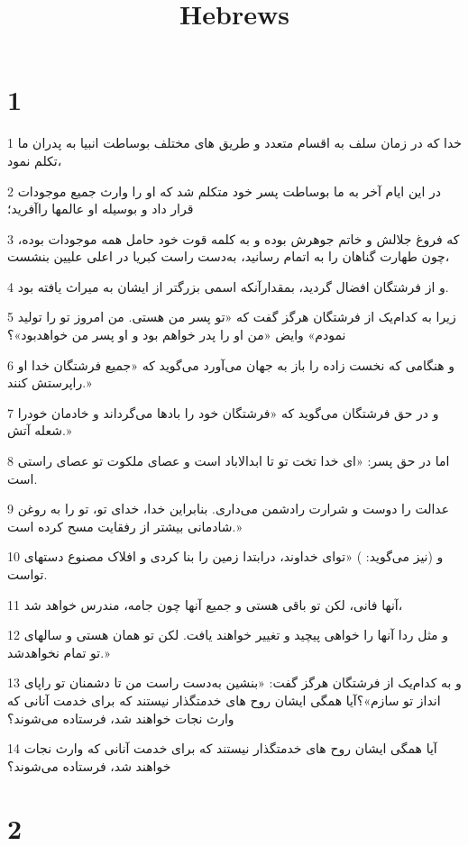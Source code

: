 

\title{Hebrews}


\chapter{1}

\par 1 خدا که در زمان سلف به اقسام متعدد و طریق های مختلف بوساطت انبیا به پدران ما تکلم نمود،
\par 2 در این ایام آخر به ما بوساطت پسر خود متکلم شد که او را وارث جمیع موجودات قرار داد و بوسیله او عالمها راآفرید؛
\par 3 که فروغ جلالش و خاتم جوهرش بوده و به کلمه قوت خود حامل همه موجودات بوده، چون طهارت گناهان را به اتمام رسانید، به‌دست راست کبریا در اعلی علیین بنشست،
\par 4 و از فرشتگان افضال گردید، بمقدارآنکه اسمی بزرگتر از ایشان به میراث یافته بود.
\par 5 زیرا به کدام‌یک از فرشتگان هرگز گفت که «تو پسر من هستی. من امروز تو را تولید نمودم» وایض «من او را پدر خواهم بود و او پسر من خواهدبود»؟
\par 6 و هنگامی که نخست زاده را باز به جهان می‌آورد می‌گوید که «جمیع فرشتگان خدا او راپرستش کنند.»
\par 7 و در حق فرشتگان می‌گوید که «فرشتگان خود را بادها می‌گرداند و خادمان خودرا شعله آتش.»
\par 8 اما در حق پسر: «ای خدا تخت تو تا ابدالاباد است و عصای ملکوت تو عصای راستی است.
\par 9 عدالت را دوست و شرارت رادشمن می‌داری. بنابراین خدا، خدای تو، تو را به روغن شادمانی بیشتر از رفقایت مسح کرده است.»
\par 10 و (نیز می‌گوید: ) «تو‌ای خداوند، درابتدا زمین را بنا کردی و افلاک مصنوع دستهای تواست.
\par 11 آنها فانی، لکن تو باقی هستی و جمیع آنها چون جامه، مندرس خواهد شد،
\par 12 و مثل ردا آنها را خواهی پیچید و تغییر خواهند یافت. لکن تو همان هستی و سالهای تو تمام نخواهدشد.»
\par 13 و به کدام‌یک از فرشتگان هرگز گفت: «بنشین به‌دست راست من تا دشمنان تو راپای انداز تو سازم»؟آیا همگی ایشان روح های خدمتگذار نیستند که برای خدمت آنانی که وارث نجات خواهند شد، فرستاده می‌شوند؟
\par 14 آیا همگی ایشان روح های خدمتگذار نیستند که برای خدمت آنانی که وارث نجات خواهند شد، فرستاده می‌شوند؟

\chapter{2}

